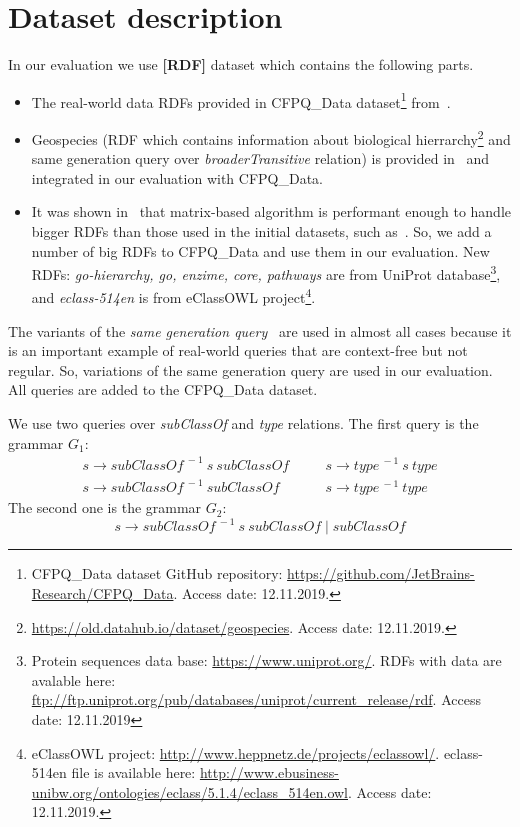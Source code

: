\section{Dataset description}

In our evaluation we use \textbf{[RDF]} dataset which contains the following parts.
\begin{itemize}
\item The real-world data RDFs provided in CFPQ\_Data dataset\footnote{CFPQ\_Data dataset GitHub repository: \url{https://github.com/JetBrains-Research/CFPQ_Data}. Access date: 12.11.2019.} from~\cite{Mishin:2019:ECP:3327964.3328503}.
\item Geospecies (RDF which contains information about biological hierrarchy\footnote{\url{https://old.datahub.io/dataset/geospecies}. Access date: 12.11.2019.} and same generation query over \textit{broaderTransitive} relation) is provided in~\cite{Kuijpers:2019:ESC:3335783.3335791} and integrated in our evaluation with CFPQ\_Data.
\item It was shown in~\cite{Mishin:2019:ECP:3327964.3328503} that matrix-based algorithm is performant enough to handle bigger RDFs than those used in the initial datasets, such as~\cite{RDF}.
So, we add a number of big RDFs to CFPQ\_Data and use them in our evaluation.
New RDFs: \textit{go-hierarchy, go, enzime, core, pathways} are from UniProt database\footnote{Protein sequences data base: \url{https://www.uniprot.org/}. RDFs with data are avalable here: \url{ftp://ftp.uniprot.org/pub/databases/uniprot/current_release/rdf}. Access date: 12.11.2019}, and \textit{eclass-514en} is from eClassOWL project\footnote{eClassOWL project: \url{http://www.heppnetz.de/projects/eclassowl/}. eclass-514en file is available here: \url{http://www.ebusiness-unibw.org/ontologies/eclass/5.1.4/eclass_514en.owl}. Access date: 12.11.2019.}.
\end{itemize}

The variants of the \textit{same generation query}~\cite{FndDB} are used in almost all cases because it is an important example of real-world queries that are context-free but not regular.
So, variations of the same generation query are used in our evaluation.
All queries are added to the CFPQ\_Data dataset.

We use two queries over \textit{subClassOf} and \textit{type} relations.
The first query is the grammar $G_1$:
\[
 \begin{array}{lcl}
   s  \rightarrow \textit{subClassOf}^{\ -1} \ s \ \textit{subClassOf}   & \quad & s  \rightarrow \textit{type}^{\ -1} \ s \ \textit{type}     \\
   s  \rightarrow \textit{subClassOf}^{\ -1} \ \textit{subClassOf}       & \quad & s  \rightarrow  \textit{type}^{\ -1}  \ \textit{type}

 \end{array}
 \]
The second one is the grammar $G_2$: \[s \rightarrow \textit{subClassOf}^{\ -1} \ s \ \textit{subClassOf} \mid  \textit{subClassOf}\]

